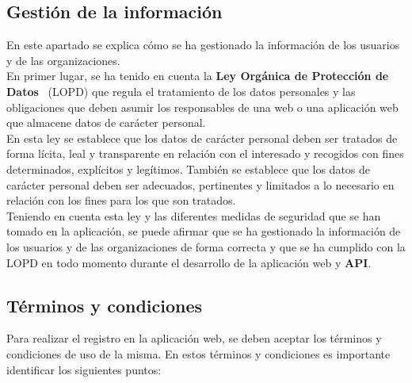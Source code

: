 \subsection{Gestión de la información}\label{subsec:gestion-de-la-informacion}

En este apartado se explica cómo se ha gestionado la información de los usuarios y de las organizaciones. \\

En primer lugar, se ha tenido en cuenta la \textbf{Ley Orgánica de Protección de Datos}~\cite{ley-proteccion-datos} (LOPD) que
regula el tratamiento de los datos personales y las obligaciones que deben asumir los responsables de una web o una
aplicación web que almacene datos de carácter personal. \\

En esta ley se establece que los datos de carácter personal deben ser tratados de forma lícita, leal y transparente en
relación con el interesado y recogidos con fines determinados, explícitos y legítimos. También se establece que los datos
de carácter personal deben ser adecuados, pertinentes y limitados a lo necesario en relación con los fines para los que
son tratados. \\

Teniendo en cuenta esta ley y las diferentes medidas de seguridad que se han tomado en la aplicación, se puede afirmar
que se ha gestionado la información de los usuarios y de las organizaciones de forma correcta y que se ha cumplido con
la LOPD en todo momento durante el desarrollo de la aplicación web y \textbf{API}.

\subsection{Términos y condiciones}\label{subsec:terminos-y-condiciones}

Para realizar el registro en la aplicación web, se deben aceptar los términos y condiciones de uso de la misma. En estos
términos y condiciones es importante identificar los siguientes puntos:

